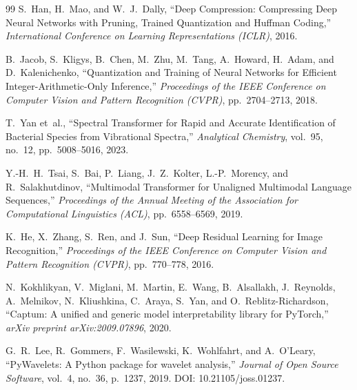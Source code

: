 \documentclass[preprint,12pt]{elsarticle}
\begin{document}
\begin{thebibliography}{99}
S.~Han, H.~Mao, and W.~J.~Dally, ``Deep Compression: Compressing Deep Neural Networks with Pruning, Trained Quantization and Huffman Coding,'' \textit{International Conference on Learning Representations (ICLR)}, 2016.

B.~Jacob, S.~Kligys, B.~Chen, M.~Zhu, M.~Tang, A.~Howard, H.~Adam, and D.~Kalenichenko, ``Quantization and Training of Neural Networks for Efficient Integer-Arithmetic-Only Inference,'' \textit{Proceedings of the IEEE Conference on Computer Vision and Pattern Recognition (CVPR)}, pp.~2704--2713, 2018.

T.~Yan et~al., ``Spectral Transformer for Rapid and Accurate Identification of Bacterial Species from Vibrational Spectra,'' \textit{Analytical Chemistry}, vol.~95, no.~12, pp.~5008--5016, 2023.

Y.-H.~H.~Tsai, S.~Bai, P.~Liang, J.~Z.~Kolter, L.-P.~Morency, and R.~Salakhutdinov, ``Multimodal Transformer for Unaligned Multimodal Language Sequences,'' \textit{Proceedings of the Annual Meeting of the Association for Computational Linguistics (ACL)}, pp.~6558--6569, 2019.

K.~He, X.~Zhang, S.~Ren, and J.~Sun, ``Deep Residual Learning for
Image Recognition,'' \textit{Proceedings of the IEEE Conference on
Computer Vision and Pattern Recognition (CVPR)}, pp.~770--778, 2016.

N.~Kokhlikyan, V.~Miglani, M.~Martin, E.~Wang, B.~Alsallakh,
J.~Reynolds, A.~Melnikov, N.~Kliushkina, C.~Araya, S.~Yan, and
O.~Reblitz-Richardson, ``Captum: A unified and generic model
interpretability library for PyTorch,'' \textit{arXiv preprint
arXiv:2009.07896}, 2020.

G.~R.~Lee, R.~Gommers, F.~Wasilewski, K.~Wohlfahrt, and A.~O'Leary,
``PyWavelets: A Python package for wavelet analysis,'' \textit{Journal
of Open Source Software}, vol.~4, no.~36, p.~1237, 2019.
DOI: 10.21105/joss.01237.

\end{thebibliography}
\end{document}
